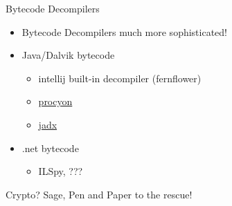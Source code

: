 \begin{frame}[fragile]
  {Bytecode Decompilers}

  \begin{itemize}
    \item Bytecode Decompilers much more sophisticated!
    \item Java/Dalvik bytecode
      \begin{itemize}
        \item intellij built-in decompiler (fernflower)
        \item
          \href{https://bitbucket.org/mstrobel/procyon/}{procyon}
        \item \href{https://github.com/skylot/jadx}{jadx}
      \end{itemize}
    \item .net bytecode
      \begin{itemize}
        \item ILSpy, ???
      \end{itemize}
  \end{itemize}

\end{frame}



{
\begin{frame}[fragile]
	{Crypto? Sage, Pen and Paper to the rescue!}

%	
%	
\end{frame}
}


